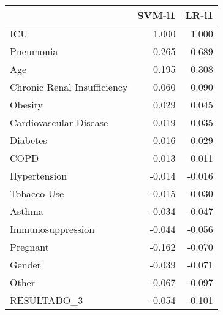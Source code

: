 \begin{tabular}{lrr}
\toprule
{} &  SVM-l1 &  LR-l1 \\
\midrule
ICU                         &   1.000 &  1.000 \\
Pneumonia                   &   0.265 &  0.689 \\
Age                         &   0.195 &  0.308 \\
Chronic Renal Insufficiency &   0.060 &  0.090 \\
Obesity                     &   0.029 &  0.045 \\
Cardiovascular Disease      &   0.019 &  0.035 \\
Diabetes                    &   0.016 &  0.029 \\
COPD                        &   0.013 &  0.011 \\
Hypertension                &  -0.014 & -0.016 \\
Tobacco Use                 &  -0.015 & -0.030 \\
Asthma                      &  -0.034 & -0.047 \\
Immunosuppression           &  -0.044 & -0.056 \\
Pregnant                    &  -0.162 & -0.070 \\
Gender                      &  -0.039 & -0.071 \\
Other                       &  -0.067 & -0.097 \\
RESULTADO\_3                 &  -0.054 & -0.101 \\
\bottomrule
\end{tabular}
